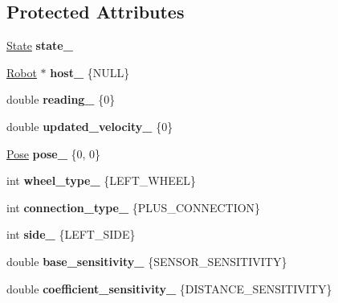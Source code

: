 \subsection*{Protected Attributes}
\begin{DoxyCompactItemize}
\item 
\hyperlink{structState}{State} {\bfseries state\+\_\+}\hypertarget{classSensor_af013bd5308a84ca4981e70b19069a12a}{}\label{classSensor_af013bd5308a84ca4981e70b19069a12a}

\item 
\hyperlink{classRobot}{Robot} $\ast$ {\bfseries host\+\_\+} \{N\+U\+LL\}\hypertarget{classSensor_af7b52fb67a86d33e6e838f9fbc60d20a}{}\label{classSensor_af7b52fb67a86d33e6e838f9fbc60d20a}

\item 
double {\bfseries reading\+\_\+} \{0\}\hypertarget{classSensor_ad71b1c465eae9ddf1da31cff1cbe3736}{}\label{classSensor_ad71b1c465eae9ddf1da31cff1cbe3736}

\item 
double {\bfseries updated\+\_\+velocity\+\_\+} \{0\}\hypertarget{classSensor_a0b8dd73cd25ed285aeaa07305a4156e9}{}\label{classSensor_a0b8dd73cd25ed285aeaa07305a4156e9}

\item 
\hyperlink{structPose}{Pose} {\bfseries pose\+\_\+} \{0, 0\}\hypertarget{classSensor_ad060f21909f3e4f5dfd310cb2fa52000}{}\label{classSensor_ad060f21909f3e4f5dfd310cb2fa52000}

\item 
int {\bfseries wheel\+\_\+type\+\_\+} \{L\+E\+F\+T\+\_\+\+W\+H\+E\+EL\}\hypertarget{classSensor_a3bcdaee50e10a6a65f277053222c0e34}{}\label{classSensor_a3bcdaee50e10a6a65f277053222c0e34}

\item 
int {\bfseries connection\+\_\+type\+\_\+} \{P\+L\+U\+S\+\_\+\+C\+O\+N\+N\+E\+C\+T\+I\+ON\}\hypertarget{classSensor_ab7f8dd25814bd8a70f0f86b742ccb13c}{}\label{classSensor_ab7f8dd25814bd8a70f0f86b742ccb13c}

\item 
int {\bfseries side\+\_\+} \{L\+E\+F\+T\+\_\+\+S\+I\+DE\}\hypertarget{classSensor_a89600e581be05751091765996a7ed21f}{}\label{classSensor_a89600e581be05751091765996a7ed21f}

\item 
double {\bfseries base\+\_\+sensitivity\+\_\+} \{S\+E\+N\+S\+O\+R\+\_\+\+S\+E\+N\+S\+I\+T\+I\+V\+I\+TY\}\hypertarget{classSensor_a4ca7cd5e6f6370c44e31f24450a19f0f}{}\label{classSensor_a4ca7cd5e6f6370c44e31f24450a19f0f}

\item 
double {\bfseries coefficient\+\_\+sensitivity\+\_\+} \{D\+I\+S\+T\+A\+N\+C\+E\+\_\+\+S\+E\+N\+S\+I\+T\+I\+V\+I\+TY\}\hypertarget{classSensor_a633094deb2c2b5636ef252976c6b702e}{}\label{classSensor_a633094deb2c2b5636ef252976c6b702e}

\end{DoxyCompactItemize}


